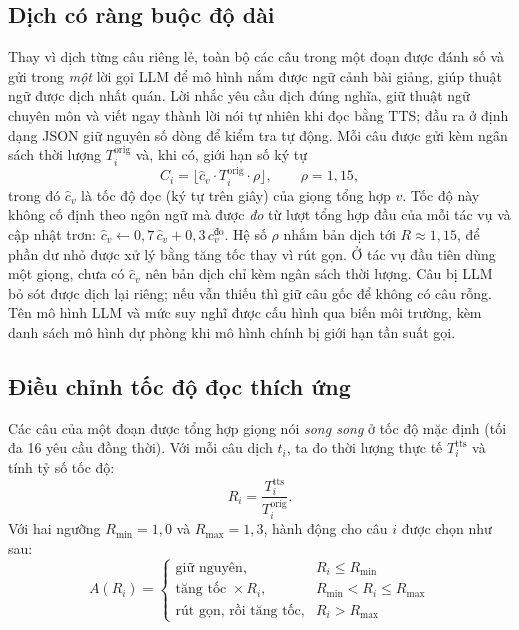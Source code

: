 \documentclass{IEEEtran}
\begin{document}
\subsection{Dịch có ràng buộc độ dài}
\label{sub:translate}
Thay vì dịch từng câu riêng lẻ, toàn bộ các câu trong một đoạn được đánh số và gửi trong \emph{một} lời gọi LLM để mô hình nắm được ngữ cảnh bài giảng, giúp thuật ngữ được dịch nhất quán. Lời nhắc yêu cầu dịch đúng nghĩa, giữ thuật ngữ chuyên môn và viết ngay thành lời nói tự nhiên khi đọc bằng TTS; đầu ra ở định dạng JSON giữ nguyên số dòng để kiểm tra tự động. Mỗi câu được gửi kèm ngân sách thời lượng $T_i^{\mathrm{orig}}$ và, khi có, giới hạn số ký tự
\begin{equation}
C_i = \bigl\lfloor \hat{c}_v \cdot T_i^{\mathrm{orig}} \cdot \rho \bigr\rfloor, \qquad \rho = 1{,}15,
\label{eq:maxchars}
\end{equation}
trong đó $\hat{c}_v$ là tốc độ đọc (ký tự trên giây) của giọng tổng hợp $v$. Tốc độ này không cố định theo ngôn ngữ mà được \emph{đo} từ lượt tổng hợp đầu của mỗi tác vụ và cập nhật trơn: $\hat{c}_v \gets 0{,}7\,\hat{c}_v + 0{,}3\,c_v^{\mathrm{đo}}$. Hệ số $\rho$ nhắm bản dịch tới $R \approx 1{,}15$, để phần dư nhỏ được xử lý bằng tăng tốc thay vì rút gọn. Ở tác vụ đầu tiên dùng một giọng, chưa có $\hat{c}_v$ nên bản dịch chỉ kèm ngân sách thời lượng. Câu bị LLM bỏ sót được dịch lại riêng; nếu vẫn thiếu thì giữ câu gốc để không có câu rỗng. Tên mô hình LLM và mức suy nghĩ được cấu hình qua biến môi trường, kèm danh sách mô hình dự phòng khi mô hình chính bị giới hạn tần suất gọi.

\subsection{Điều chỉnh tốc độ đọc thích ứng}
Các câu của một đoạn được tổng hợp giọng nói \emph{song song} ở tốc độ mặc định (tối đa 16 yêu cầu đồng thời). Với mỗi câu dịch $t_i$, ta đo thời lượng thực tế $T_i^{\mathrm{tts}}$ và tính tỷ số tốc độ:
\begin{equation}
R_i = \frac{T_i^{\mathrm{tts}}}{T_i^{\mathrm{orig}}}.
\label{eq:ratio}
\end{equation}
Với hai ngưỡng $R_{\min} = 1{,}0$ và $R_{\max} = 1{,}3$, hành động cho câu $i$ được chọn như sau:
\begin{equation}
A(R_i) =
\begin{cases}
\text{giữ nguyên}, & R_i \le R_{\min}\\
\text{tăng tốc } \times R_i, & R_{\min} < R_i \le R_{\max}\\
\text{rút gọn, rồi tăng tốc}, & R_i > R_{\max}
\end{cases}
\label{eq:policy}
\end{equation}
\end{document}
